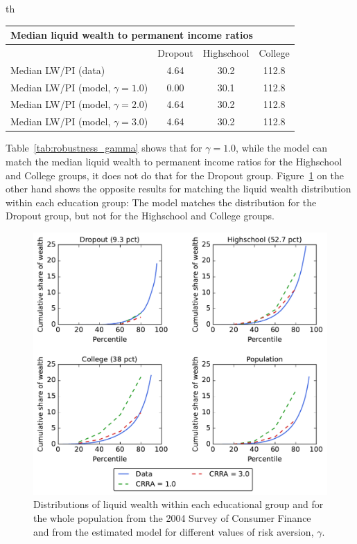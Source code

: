 \documentclass[../HAFiscal]{subfiles}
\begin{document}
\begin{table}{th}
\begin{center}
\begin{tabular}{lccc}
	\multicolumn{4}{l}{Median liquid wealth to permanent income ratios} \\ \midrule
	& Dropout & Highschool & College \\ \midrule
	Median LW/PI (data) & 4.64 & 30.2 & 112.8 \\ 
	Median LW/PI (model, $\gamma = 1.0$) & 0.00 & 30.1 & 112.8 \\	
	Median LW/PI (model, $\gamma = 2.0$) & 4.64 & 30.2 & 112.8 \\
	Median LW/PI (model, $\gamma = 3.0$) & 4.64 & 30.2 & 112.8 \\ \bottomrule
\end{tabular}
\end{center}	
\end{table}

Table~\ref{tab:robustness_gamma} shows that for $\gamma=1.0$, while the model can match the median liquid wealth to permanent income ratios for the Highschool and College groups, it does not do that for the Dropout group. Figure~\ref{fig:LorenzPts_robustness_CRRA} on the other hand shows the opposite results for matching the liquid wealth distribution within each education group: The model matches the distribution for the Dropout group, but not for the Highschool and College groups. 

\begin{figure}[th]
	\begin{center}
		\includegraphics[width=.9\textwidth]{../Figures/LorenzPoints_robustness_CRRA.pdf}
		\caption{Distributions of liquid wealth within each educational group and for the whole population from the 2004 Survey of Consumer Finance and from the estimated model for different values of risk aversion, $\gamma$.}
		\label{fig:LorenzPts_robustness_CRRA}
	\end{center}
\end{figure}
\end{document}
